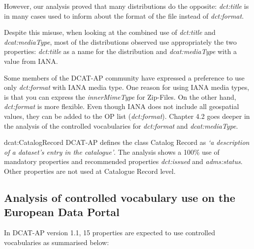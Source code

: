 \documentclass[<options>]{elsarticle}
\begin{document}
However, our analysis proved that many distributions do the opposite: \textit{dct:title} is in many cases used to inform about the format of the file instead of \textit{dct:format}. 

Despite this misuse, when looking at the combined use of \textit{dct:title} and \textit{dcat:mediaType}, most of the distributions observed use appropriately the two properties: \textit{dct:title} as a name for the distribution and \textit{dcat:mediaType} with a value from IANA.

Some members of the DCAT-AP community have expressed a preference to use only \textit{dct:format} with IANA media type. One reason for using IANA media types, is that you can express the \textit{innerMimeType} for Zip-Files. On the other hand, \textit{dct:format} is more flexible. Even though IANA does not include all geospatial values, they can be added to the OP list (\textit{dct:format}). Chapter 4.2 goes deeper in the analysis of the controlled vocabularies for \textit{dct:format} and \textit{dcat:mediaType}. 

dcat:CatalogRecord
DCAT-AP defines the class Catalog Record as \textit{‘a description of a dataset’s entry in the catalogue’}. The analysis shows a 100\% use of mandatory properties and recommended properties\textit{ dct:issued }and \textit{adms:status}. Other properties are not used at Catalogue Record level.

\subsection{Analysis of controlled vocabulary use on the European Data Portal}
In DCAT-AP version 1.1, 15 properties are expected to use controlled vocabularies as summarised below: 
\end{document}

